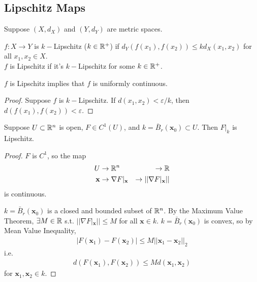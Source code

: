 \documentclass[a4paper]{article}
\begin{document}
\subsection{Lipschitz Maps}
Suppose $\left(X,d_X\right)$ and $\left(Y,d_Y\right)$ are metric spaces.

\begin{defi}
$f:X\to Y$ is $k-$Lipschitz ($k \in \mathbb{R}^+$) if $d_Y\left(f\left(x_1\right),f\left(x_2\right)\right) \leq kd_X\left(x_1,x_2\right)$ for all $x_1,x_2 \in X$.\\
$f$ is Lipschitz if it's $k-$Lipschitz for some $k \in \mathbb{R}^+$.
\end{defi}

\begin{prop}
$f$ is Lipschitz implies that $f$ is uniformly continuous.
\begin{proof}
Suppose $f$ is $k-$Lipschitz. If $d\left(x_1,x_2\right) < \varepsilon/k$, then $d\left(f\left(x_1\right),f\left(x_2\right)\right) < \varepsilon$.
\end{proof}
\end{prop}

\begin{prop}
Suppose $U \subset \mathbb{R}^n$ is open, $F \in C^1 \left(U\right)$, and $k = \bar{B}_r\left(\mathbf{x}_0\right) \subset U$. Then $F|_k$ is Lipschitz.
\begin{proof}
$F$ is $C^1$, so the map
\begin{equation*}
\begin{aligned}
U &\to \mathbb{R}^n &\to \mathbb{R}\\
\mathbf{x} &\to \nabla F|_\mathbf{x} &\to ||\nabla F|_\mathbf{x}||
\end{aligned}
\end{equation*}
is continuous.

$k=\bar{B}_r\left(\mathbf{x}_0\right)$ is a closed and bounded subset of $\mathbb{R}^n$. By the Maximum Value Theorem, $\exists M \in \mathbb{R}$ s.t. $||\nabla F|_\mathbf{x}|| \leq M$ for all $\mathbf{x} \in k$. $k=\bar{B}_r\left(\mathbf{x}_0\right)$ is convex, so by Mean Value Inequality,
\begin{equation*}
\begin{aligned}
|F\left(\mathbf{x}_1\right)-F\left(\mathbf{x}_2\right)| \leq M||\mathbf{x}_1-\mathbf{x}_2||_2
\end{aligned}
\end{equation*}
i.e.
\begin{equation*}
\begin{aligned}
d\left(F\left(\mathbf{x}_1\right),F\left(\mathbf{x}_2\right)\right) \leq M d\left(\mathbf{x}_1,\mathbf{x}_2\right)
\end{aligned}
\end{equation*}
for $\mathbf{x}_1,\mathbf{x}_2 \in k$.
\end{proof}
\end{prop}
\end{document}

